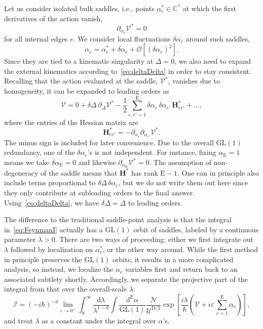 \documentclass[12pt]{article}
\numberwithin{figure}{section}
\def \be {\begin{equation}}
\def \ee {\end{equation}}
\def \C {\mathbb{C}}
\def \D {\mathrm{D}}
\def \E {\mathrm{E}}
\def \U {\mathcal{U}}
\def \d {\mathrm{d}}
\def \eps {\varepsilon}
\def \V {\mathcal{V}}
\def \I {\mathcal{I}}
\def \GL {\mathrm{GL}}
\def \N {\mathcal{N}}
\newcommand{\mc}[1]{\mathcal{#1}}
\begin{document}
	Let us consider isolated bulk saddles, i.e., points $\alpha_e^\ast \in \C^\ast$ at which the first derivatives of the action vanish,
	\be
	\partial_{\alpha_{e}} \V^\ast = 0
	\ee
	for all internal edges $e$. We consider local fluctuations $\delta\alpha_e$ around such saddles,
	\be
	\alpha_e = \alpha_e^\ast + \delta\alpha_e + \mc{O}\! \left[ \left(\delta\alpha_e \right)^2 \right].
	\ee
	Since they are tied to a kinematic singularity at $\Delta=0$, we also need to expand the external kinematics according to~\eqref{eq:deltaDelta} in order to stay consistent.
	Recalling that the action evaluated at the saddle, $\V^\ast$, vanishes due to homogeneity, it can be expanded to leading orders as
	\be\label{eq:V-bulk}
	\V = 0 + \delta \Delta\, \partial_\Delta \V^\ast - \frac{1}{2} \sum_{e,e'=1}^{\E} \delta\alpha_e\, \delta\alpha_{e'}\, \mathbf{H}_{e e'}^\ast + \ldots,
	\ee
	where the entries of the Hessian matrix are
	\be\label{eq:Hessian}
	\mathbf{H}_{e e'}^\ast = -\partial_{\alpha_e} \partial_{\alpha_{e'}} \V^\ast.
	\ee
	The minus sign is included for later convenience. Due to the overall $\mathrm{GL}(1)$ redundancy, one of the $\delta\alpha_e$'s is not independent. For instance, fixing $\alpha_{\E}=1$ means we take $\delta \alpha_{\E} = 0$ and likewise $\partial_{\alpha_\E}\V^\ast = 0$. The assumption of non-degeneracy of the saddle means that $\mathbf{H}^\ast$ has rank $\E-1$. One can in principle also include terms proportional to $\delta \Delta\, \delta\alpha_e$, but we do not write them out here since they only contribute at subleading orders to the final answer.
	Using~\eqref{eq:deltaDelta}, we have $\delta \Delta = \Delta$ to leading orders.
	
	
	The difference to the traditional saddle-point analysis \cite{doi:10.1098/rspa.1997.0122,10.1215/S0012-9074-02-11221-6} is that the integral in~\eqref{eq:FeynmanI} actually has a $\GL(1)$ orbit of saddles, labeled by a continuous parameter $\lambda > 0$. There are two ways of proceeding: either we first integrate out $\lambda$ followed by localization on $\alpha_e^\ast$, or the other way around. While the first method
	in principle preserves the $\GL(1)$ orbits, it results in a more complicated analysis, so instead, we localize the $\alpha_e$ variables first and return back to an associated subtlety shortly.
	Accordingly, we separate the projective part of the integral from that over the overall-scale $\lambda$:
	\be\label{eq:I-lambda}
	\I = (-i\hbar)^{-d} \lim_{\eps\to0^+}  \int_0^\infty \frac{\d\lambda}{\lambda^{1-d}} \int \frac{\d^{\E} \alpha}{\GL(1)} \frac{\N}{\U^{\D/2}} \exp \left[ \frac{i\lambda}{\hbar}\left(\V + i\eps\, {\textstyle\sum_{e=1}^{\E}}\alpha_e\right)\right],
	\ee
	and
	treat $\lambda$ as a constant under the integral over $\alpha$'s.
	
\end{document}

